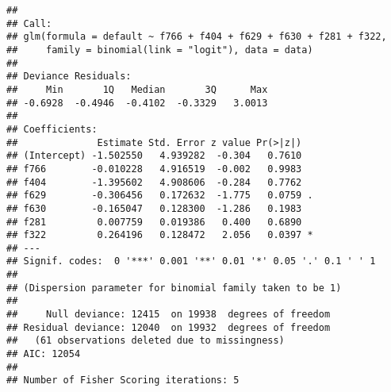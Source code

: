 \documentclass[]{book}
\newenvironment{Shaded}{\begin{snugshade}}{\end{snugshade}}
\newcommand{\KeywordTok}[1]{\textcolor[rgb]{0.13,0.29,0.53}{\textbf{#1}}}
\newcommand{\DataTypeTok}[1]{\textcolor[rgb]{0.13,0.29,0.53}{#1}}
\newcommand{\StringTok}[1]{\textcolor[rgb]{0.31,0.60,0.02}{#1}}
\newcommand{\CommentTok}[1]{\textcolor[rgb]{0.56,0.35,0.01}{\textit{#1}}}
\newcommand{\OperatorTok}[1]{\textcolor[rgb]{0.81,0.36,0.00}{\textbf{#1}}}
\newcommand{\AlertTok}[1]{\textcolor[rgb]{0.94,0.16,0.16}{#1}}
\newcommand{\NormalTok}[1]{#1}
\theoremstyle{definition}
\theoremstyle{definition}
\theoremstyle{definition}
\theoremstyle{remark}
\begin{document}
\begin{Shaded}
\end{Shaded}

\begin{verbatim}
## 
## Call:
## glm(formula = default ~ f766 + f404 + f629 + f630 + f281 + f322, 
##     family = binomial(link = "logit"), data = data)
## 
## Deviance Residuals: 
##     Min       1Q   Median       3Q      Max  
## -0.6928  -0.4946  -0.4102  -0.3329   3.0013  
## 
## Coefficients:
##              Estimate Std. Error z value Pr(>|z|)  
## (Intercept) -1.502550   4.939282  -0.304   0.7610  
## f766        -0.010228   4.916519  -0.002   0.9983  
## f404        -1.395602   4.908606  -0.284   0.7762  
## f629        -0.306456   0.172632  -1.775   0.0759 .
## f630        -0.165047   0.128300  -1.286   0.1983  
## f281         0.007759   0.019386   0.400   0.6890  
## f322         0.264196   0.128472   2.056   0.0397 *
## ---
## Signif. codes:  0 '***' 0.001 '**' 0.01 '*' 0.05 '.' 0.1 ' ' 1
## 
## (Dispersion parameter for binomial family taken to be 1)
## 
##     Null deviance: 12415  on 19938  degrees of freedom
## Residual deviance: 12040  on 19932  degrees of freedom
##   (61 observations deleted due to missingness)
## AIC: 12054
## 
## Number of Fisher Scoring iterations: 5
\end{verbatim}
\end{document}
